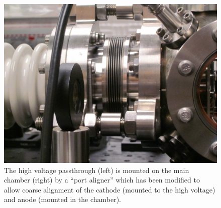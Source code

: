 \begin{figure}
  \centering
  \includegraphics{aligner.jpg}
  \caption{
    The high voltage passthrough (left) is mounted on the main chamber (right) by a ``port aligner'' which has been modified to allow coarse alignment of the cathode (mounted to the high voltage) and anode (mounted in the chamber).
  }
  \label{fig:aligner-pic}
\end{figure}



